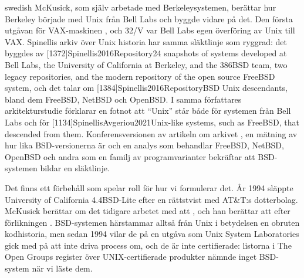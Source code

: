 \begin{onlyin}{swedish}
McKusick, som själv arbetade med Berkeleysystemen, berättar hur Berkeley
började med Unix från Bell Labs och byggde vidare på det.
Den första utgåvan för VAX-maskinen
, och 32/V var Bell Labs egen överföring av Unix till VAX.
Spinellis arkiv över Unix historia har samma släktlinje som ryggrad: det
byggdes av [1372]{Spinellis2016Repository}{24
snapshots of systems developed at Bell Labs, the University of California
at Berkeley, and the 386BSD team, two legacy repositories, and the modern
repository of the open source FreeBSD system}, och det talar om
[1384]{Spinellis2016Repository}{BSD Unix
descendants}, bland dem FreeBSD, NetBSD och OpenBSD.
I samma författares arkitekturstudie förklarar en fotnot att
\enquote{Unix} står både för systemen från Bell Labs och för
[1134]{SpinellisAvgeriou2021}{Unix-like systems,
such as FreeBSD, that descended from them}.
Konferensversionen av artikeln om arkivet%
\autocite{Spinellis2015Repository}, en mätning av hur lika
BSD-versionerna är\autocite{Yamamoto2005Measuring} och en analys som
behandlar FreeBSD, NetBSD, OpenBSD och andra som en familj av
programvarianter\autocite{Tenev2012Bioinformatics} bekräftar att
BSD-systemen bildar en släktlinje.

Det finns ett förbehåll som spelar roll för hur vi formulerar det.
År 1994 släppte University of California 4.4BSD-Lite efter en
rättstvist med AT\&T:s dotterbolag.
McKusick berättar om det tidigare arbetet med att
, och han berättar att efter förlikningen
.
BSD-systemen härstammar alltså från Unix i betydelsen en obruten
kodhistoria, men sedan 1994 vilar de på en utgåva som Unix System
Laboratories gick med på att inte driva process om, och de är inte
certifierade: listorna i The Open Groups register över UNIX-certifierade
produkter nämnde inget BSD-system när vi läste dem.
\end{onlyin}

